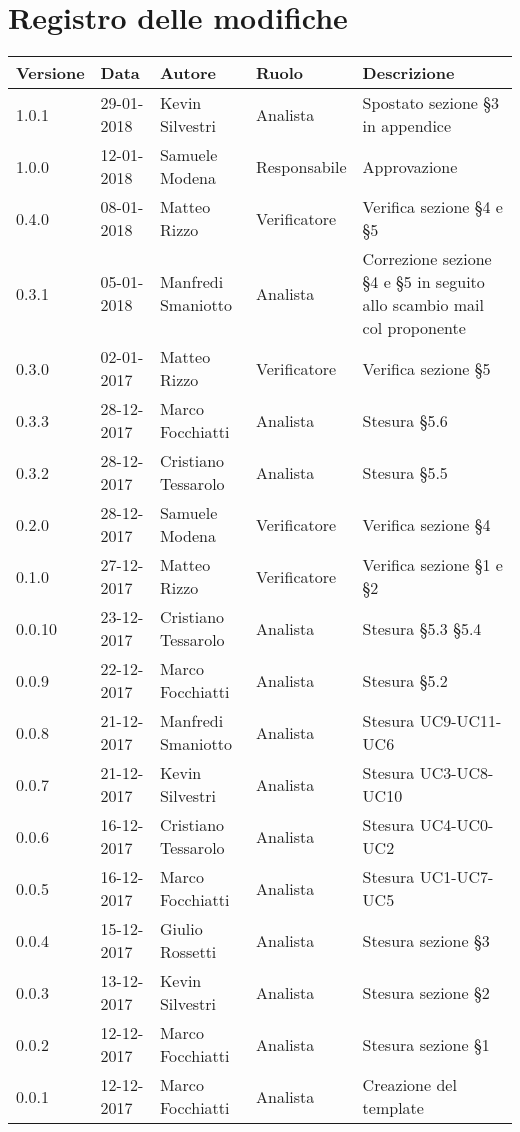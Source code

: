 \documentclass[./AnalisideiRequisiti.tex]{subfiles}
\begin{document}
	
{
	\chapter*{Registro delle modifiche}
\setlength\LTleft{-22mm}
	\begin{longtable}{|p{20mm}|p{20mm}|p{40mm}|p{30mm}|p{50mm}|}
		\hline
		\textbf{Versione} & \textbf{Data} & \textbf{Autore} & \textbf{Ruolo} & \textbf{Descrizione} \\ \hline  
		1.0.1 & 29-01-2018 & Kevin Silvestri & Analista & Spostato sezione §3 in appendice\\ \hline
		1.0.0 & 12-01-2018 & Samuele Modena & Responsabile & Approvazione\\ \hline
		0.4.0 & 08-01-2018 & Matteo Rizzo & Verificatore & Verifica sezione §4 e §5\\ \hline
		0.3.1 & 05-01-2018 & Manfredi Smaniotto & Analista & Correzione sezione §4 e §5 in seguito allo scambio mail col proponente \\ \hline		
		0.3.0 & 02-01-2017 & Matteo Rizzo & Verificatore & Verifica sezione §5\\ \hline
		0.3.3 & 28-12-2017 & Marco Focchiatti & Analista & Stesura §5.6\\ \hline	
		0.3.2 & 28-12-2017 & Cristiano Tessarolo & Analista & Stesura §5.5\\ \hline
	   	0.2.0 & 28-12-2017 & Samuele Modena & Verificatore & Verifica sezione §4\\ \hline
	   	0.1.0 & 27-12-2017 & Matteo Rizzo & Verificatore & Verifica sezione §1 e §2  \\ \hline		
		0.0.10 & 23-12-2017 & Cristiano Tessarolo & Analista & Stesura §5.3 §5.4\\ \hline		
		0.0.9 & 22-12-2017 & Marco Focchiatti & Analista & Stesura §5.2 \\ \hline		
		0.0.8 & 21-12-2017 & Manfredi Smaniotto & Analista & Stesura UC9-UC11-UC6\\ \hline
		0.0.7 & 21-12-2017 & Kevin Silvestri & Analista & Stesura UC3-UC8-UC10\\ \hline
		0.0.6 & 16-12-2017 & Cristiano Tessarolo & Analista & Stesura UC4-UC0-UC2\\ \hline
		0.0.5 & 16-12-2017 & Marco Focchiatti & Analista & Stesura UC1-UC7-UC5\\ \hline
		0.0.4 & 15-12-2017 & Giulio Rossetti & Analista & Stesura sezione §3\\ \hline
		0.0.3 & 13-12-2017 & Kevin Silvestri & Analista & Stesura sezione §2\\ \hline
		0.0.2 & 12-12-2017 & Marco Focchiatti & Analista & Stesura sezione §1\\ \hline
		0.0.1 & 12-12-2017 & Marco Focchiatti & Analista & Creazione del template\\ \hline
	\end{longtable}

}	
\end{document}
